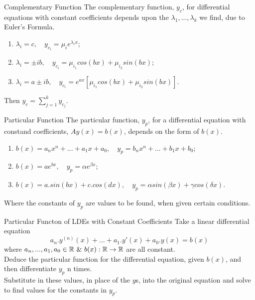 \documentclass[11pt,a4paper]{article}
\begin{document}
\subtitle{Remark 6.08 - }{Complementary Function}
The complementary function, $y_c$, for differential equations with constant coefficients depends upon the $\lambda_1, ... , \lambda_k$ we find, due to Euler's Formula.
\begin{enumerate}[label=\roman*)]
  \item $\lambda_i = c,\quad y_{c_i} = \mu_ie^{\lambda_ix}$;
  \item $\lambda_i = \pm ib,\quad y_{c_i} = \mu_{i_1}cos(bx) + \mu_{i_2}sin(bx)$;
  \item $\lambda_i = a \pm ib,\quad y_{c_i} = e^{ax}[\mu_{i_1}cos(bx) + \mu_{i_2}sin(bx)]$.
\end{enumerate}
Then $y_c = \sum_{j=1}^{k} y_{c_j}$.\\

\subtitle{Remark 6.09 - }{Particular Function}
The particular function, $y_p$, for a differential equation with constand coefficients, $Ay(x) = b(x)$, depends on the form of $b(x)$.
\begin{enumerate}[label=\roman*)]
  \item $b(x) = a_nx^n + ... + a_1x + a_0,\quad y_p = b_nx^n + ... + b_1x + b_0$;
  \item $b(x) = ae^{bx},\quad y_p = \alpha e^{\beta x}$;
  \item $b(x) = a.sin(bx) + c.cos(dx),\quad y_p = \alpha sin(\beta x) + \gamma cos(\delta x)$.
\end{enumerate}
Where the constants of $y_p$ are values to be found, when given certain conditions.

\subtitle{Theorem 6.10 - }{Particular Functon of LDEs with Constant Coefficients}
Take a linear differential equation $$a_n.y^{(n)}(x) + ... + a_1.y'(x) + a_0.y(x) = b(x)$$ where $a_n, ... , a_1, a_0 \in \real\ \mathrm{\&}\ b(x) : \real \to \real$ are all constant. \\
Deduce the particular function for the differential equation, given $b(x)$, and then differentiate $y_p$ n times. \\
Substitute in these values, in place of the $y$s, into the original equation and solve to find values for the constants in $y_p$. \\
\end{document}
